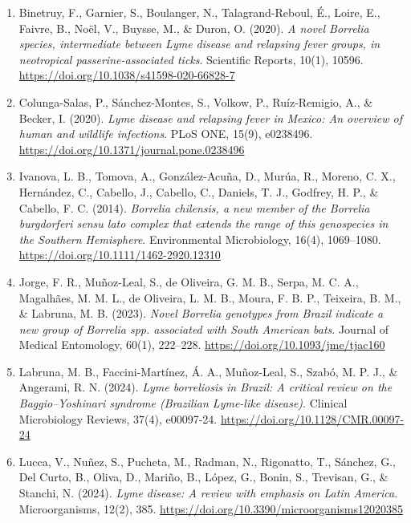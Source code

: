 \documentclass[11pt,letterpaper]{article}
\begin{document}
\begin{enumerate}
\item Binetruy, F., Garnier, S., Boulanger, N., Talagrand-Reboul, É., Loire, E., Faivre, B., Noël, V., Buysse, M., \& Duron, O. (2020). \textit{A novel Borrelia species, intermediate between Lyme disease and relapsing fever groups, in neotropical passerine-associated ticks}. Scientific Reports, 10(1), 10596. \href{https://doi.org/10.1038/s41598-020-66828-7}{https://doi.org/10.1038/s41598-020-66828-7}

\item Colunga-Salas, P., Sánchez-Montes, S., Volkow, P., Ruíz-Remigio, A., \& Becker, I. (2020). \textit{Lyme disease and relapsing fever in Mexico: An overview of human and wildlife infections}. PLoS ONE, 15(9), e0238496. \href{https://doi.org/10.1371/journal.pone.0238496}{https://doi.org/10.1371/journal.pone.0238496}

\item Ivanova, L. B., Tomova, A., González-Acuña, D., Murúa, R., Moreno, C. X., Hernández, C., Cabello, J., Cabello, C., Daniels, T. J., Godfrey, H. P., \& Cabello, F. C. (2014). \textit{Borrelia chilensis, a new member of the Borrelia burgdorferi sensu lato complex that extends the range of this genospecies in the Southern Hemisphere}. Environmental Microbiology, 16(4), 1069–1080. \href{https://doi.org/10.1111/1462-2920.12310}{https://doi.org/10.1111/1462-2920.12310}

\item Jorge, F. R., Muñoz-Leal, S., de Oliveira, G. M. B., Serpa, M. C. A., Magalhães, M. M. L., de Oliveira, L. M. B., Moura, F. B. P., Teixeira, B. M., \& Labruna, M. B. (2023). \textit{Novel Borrelia genotypes from Brazil indicate a new group of Borrelia spp. associated with South American bats}. Journal of Medical Entomology, 60(1), 222–228. \href{https://doi.org/10.1093/jme/tjac160}{https://doi.org/10.1093/jme/tjac160}

\item Labruna, M. B., Faccini-Martínez, Á. A., Muñoz-Leal, S., Szabó, M. P. J., \& Angerami, R. N. (2024). \textit{Lyme borreliosis in Brazil: A critical review on the Baggio–Yoshinari syndrome (Brazilian Lyme-like disease)}. Clinical Microbiology Reviews, 37(4), e00097-24. \href{https://doi.org/10.1128/CMR.00097-24}{https://doi.org/10.1128/CMR.00097-24}

\item Lucca, V., Nuñez, S., Pucheta, M., Radman, N., Rigonatto, T., Sánchez, G., Del Curto, B., Oliva, D., Mariño, B., López, G., Bonin, S., Trevisan, G., \& Stanchi, N. (2024). \textit{Lyme disease: A review with emphasis on Latin America}. Microorganisms, 12(2), 385. \href{https://doi.org/10.3390/microorganisms12020385}{https://doi.org/10.3390/microorganisms12020385}


\end{enumerate}
\end{document}
